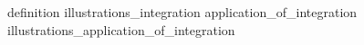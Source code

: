 \pagebreak
{definition}
\pagebreak
{illustrations_integration}
\pagebreak
{application_of_integration}
\pagebreak
{illustrations_application_of_integration}